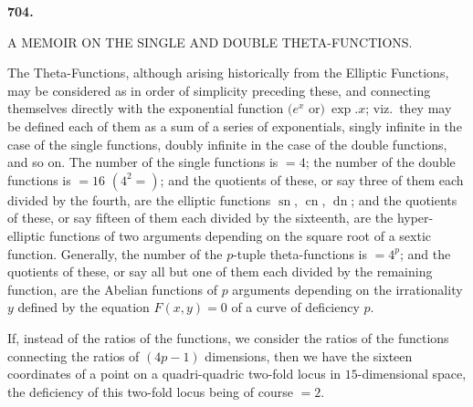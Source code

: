 \documentclass[12pt,a4paper]{article}
\DeclareMathOperator{\sn}{sn}
\DeclareMathOperator{\cn}{cn}
\DeclareMathOperator{\dn}{dn}
\theoremstyle{definition}
\begin{document}
\vspace{2em}

\begin{center}
\large\bfseries 704.\par\vspace{0.3em}
A MEMOIR ON THE SINGLE AND DOUBLE THETA-FUNCTIONS.\par\vspace{0.5em}
\normalsize{}
\end{center}

\vspace{1em}

The Theta-Functions, although arising historically from the Elliptic Functions, may be considered as in order of simplicity preceding these, and connecting themselves directly with the exponential function $(e^x$ or$)\ \exp. x$; viz.\ they may be defined each of them as a sum of a series of exponentials, singly infinite in the case of the single functions, doubly infinite in the case of the double functions, and so on. The number of the single functions is $= 4$; the number of the double functions is $= 16$ $(4^2 =)$; and the quotients of these, or say three of them each divided by the fourth, are the elliptic functions $\sn$, $\cn$, $\dn$; and the quotients of these, or say fifteen of them each divided by the sixteenth, are the hyper-elliptic functions of two arguments depending on the square root of a sextic function. Generally, the number of the $p$-tuple theta-functions is $= 4^p$; and the quotients of these, or say all but one of them each divided by the remaining function, are the Abelian functions of $p$ arguments depending on the irrationality $y$ defined by the equation $F(x, y) = 0$ of a curve of deficiency $p$.

If, instead of the ratios of the functions, we consider the ratios of the functions connecting the ratios of $(4p - 1)$ dimensions, then we have the sixteen coordinates of a point on a quadri-quadric two-fold locus in $15$-dimensional space, the deficiency of this two-fold locus being of course $= 2$.

\vspace{1em}
\end{document}
